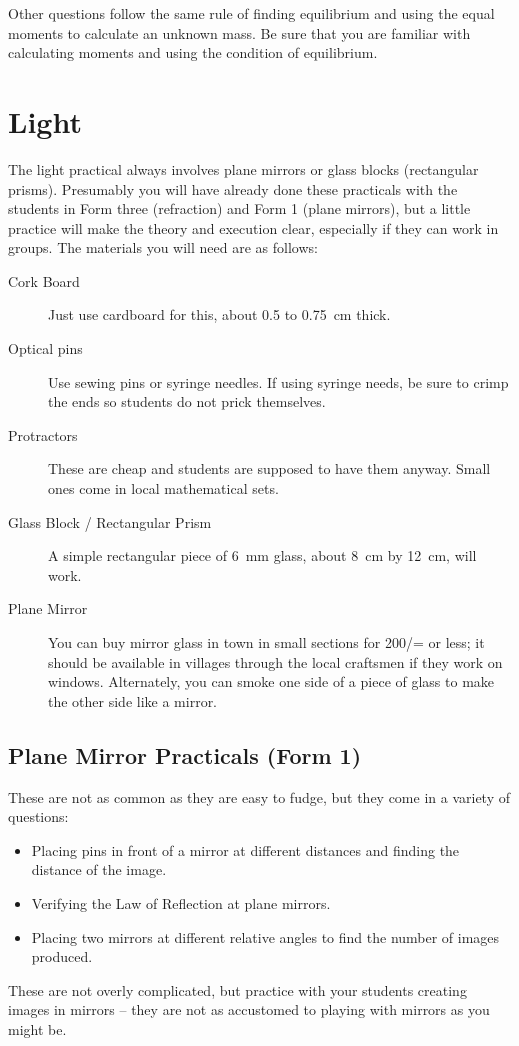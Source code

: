 Other questions follow the same rule of finding equilibrium and using the equal
moments to calculate an unknown mass. Be sure that you are familiar with calculating
moments and using the condition of equilibrium.

\section{Light}
The light practical always involves plane mirrors or glass blocks (rectangular
prisms). Presumably you will have already done these practicals with the students in Form
three (refraction) and Form 1 (plane mirrors), but a little practice will make the theory and
execution clear, especially if they can work in groups. The materials you will need are as
follows:
\begin{description}
\item[Cork Board]{Just use cardboard for this, about 0.5 to 0.75~cm thick.}
\item[Optical pins]{Use sewing pins or syringe needles. If using syringe needs, be
sure to crimp the ends so students do not prick themselves.}
\item[Protractors]{These are cheap and students are supposed to have them anyway.
Small ones come in local mathematical sets.}
\item[Glass Block / Rectangular Prism]{A simple rectangular piece of 6~mm glass,
about 8~cm by 12~cm, will work.}
\item[Plane Mirror]{You can buy mirror glass in town in small sections for 200/= or
less; it should be available in villages through the local craftsmen if they work on
windows. Alternately, you can smoke one side of a piece of glass to make the
other side like a mirror.}
\end{description}

\subsection{Plane Mirror Practicals (Form 1)}

These are not as common as they are easy to fudge, but they come in a variety of
questions:
\begin{itemize}
\item{Placing pins in front of a mirror at different distances and finding the distance of
the image.}
\item{Verifying the Law of Reflection at plane mirrors.}
\item{Placing two mirrors at different relative angles to find the number of images
produced.}
\end{itemize}
These are not overly complicated, but practice with your students creating images in
mirrors -- they are not as accustomed to playing with mirrors as you might be.


